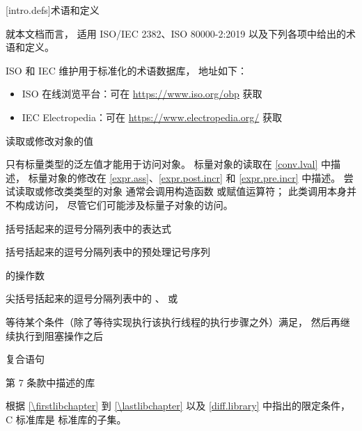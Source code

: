 [intro.defs]{术语和定义}

\pnum
{}%
就本文档而言，
适用 ISO/IEC 2382、ISO 80000-2:2019
以及下列各项中给出的术语和定义。

\pnum
ISO 和 IEC 维护用于标准化的术语数据库，
地址如下：
\begin{itemize}
\item ISO 在线浏览平台：可在 \url{https://www.iso.org/obp} 获取
\item IEC Electropedia：可在 \url{https://www.electropedia.org/} 获取
\end{itemize}

%
读取或修改对象的值

\begin{defnote}
只有标量类型的泛左值才能用于访问对象。
标量对象的读取在 \ref{conv.lval} 中描述，
标量对象的修改在
\ref{expr.ass}、\ref{expr.post.incr} 和 \ref{expr.pre.incr} 中描述。
尝试读取或修改类类型的对象
通常会调用构造函数
或赋值运算符；
此类调用本身并不构成访问，
尽管它们可能涉及标量子对象的访问。
\end{defnote}

%
 括号括起来的逗号分隔列表中的表达式

%
%
 括号括起来的逗号分隔列表中的预处理记号序列

%
%
  的操作数

%
%
尖括号括起来的逗号分隔列表中的
、
 或

%
等待某个条件（除了等待实现执行该执行线程的执行步骤之外）满足，
然后再继续执行到阻塞操作之后

%
复合语句

%
\IsoC{} 第 7 条款中描述的库
\begin{defnote}
根据 \ref{\firstlibchapter}
到 \ref{\lastlibchapter} 以及 \ref{diff.library} 中指出的限定条件，
C 标准库是 \Cpp{} 标准库的子集。
\end{defnote}

